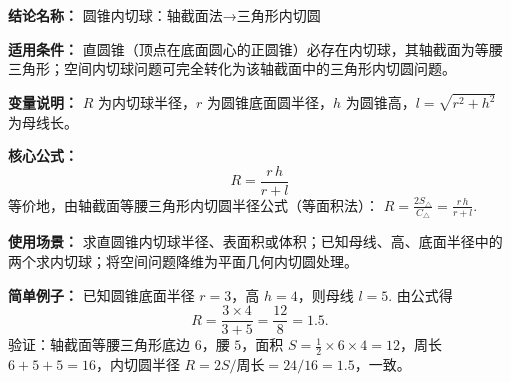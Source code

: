 \textbf{结论名称：} 圆锥内切球：轴截面法→三角形内切圆

\textbf{适用条件：} 直圆锥（顶点在底面圆心的正圆锥）必存在内切球，其轴截面为等腰三角形；空间内切球问题可完全转化为该轴截面中的三角形内切圆问题。

\textbf{变量说明：} \(R\) 为内切球半径，\(r\) 为圆锥底面圆半径，\(h\) 为圆锥高，\(l=\sqrt{r^2+h^2}\) 为母线长。

\textbf{核心公式：}
\[
\boxed{R = \frac{r\,h}{r + l}}
\]
等价地，由轴截面等腰三角形内切圆半径公式（等面积法）：
\(\displaystyle R = \frac{2S_{\triangle}}{C_{\triangle}} = \frac{r\,h}{r + l}\).

\textbf{使用场景：} 求直圆锥内切球半径、表面积或体积；已知母线、高、底面半径中的两个求内切球；将空间问题降维为平面几何内切圆处理。

\textbf{简单例子：} 已知圆锥底面半径 \(r=3\)，高 \(h=4\)，则母线 \(l=5\). 由公式得
\[
R = \frac{3 \times 4}{3 + 5} = \frac{12}{8} = 1.5.
\]
验证：轴截面等腰三角形底边 \(6\)，腰 \(5\)，面积 \(S=\frac{1}{2}\times 6 \times 4 = 12\)，周长 \(6+5+5=16\)，内切圆半径 \(R=2S/\text{周长}=24/16=1.5\)，一致。